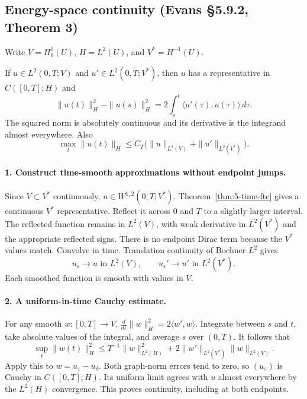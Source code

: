 \subsection{Energy-space continuity (Evans \S5.9.2, Theorem 3)}
Write $V=H^1_0(U)$, $H=L^2(U)$, and $V^*=H^{-1}(U)$.
\begin{theorem}\label{thm:5-energy-time}
If $u\in L^2(0,T;V)$ and $u'\in L^2(0,T;V^*)$, then
$u$ has a representative in $C([0,T];H)$ and
\[
 \|u(t)\|_H^2-\|u(s)\|_H^2
 =2\int_s^t\langle u'(\tau),u(\tau)\rangle\,d\tau.
\]
The squared norm is absolutely continuous and its derivative is the
integrand almost everywhere. Also
\[
 \max_t\|u(t)\|_H
 \leq C_T\bigl(\|u\|_{L^2(V)}+\|u'\|_{L^2(V^*)}\bigr).
\]
\end{theorem}
\begin{expandedproof}
\paragraph{1. Construct time-smooth approximations without endpoint jumps.}
Since $V\subset V^*$ continuously, $u\in W^{1,2}(0,T;V^*)$.
Theorem~\ref{thm:5-time-ftc} gives a continuous $V^*$ representative.
Reflect it across $0$ and $T$ to a slightly larger interval.
The reflected function remains in $L^2(V)$, with weak derivative
in $L^2(V^*)$ and the appropriate reflected signs.
There is no endpoint Dirac term because the $V^*$ values match.
Convolve in time. Translation continuity of Bochner $L^2$ gives
\[
 u_\varepsilon\to u\text{ in }L^2(V),\qquad
 u_\varepsilon'\to u'\text{ in }L^2(V^*).
\]
Each smoothed function is smooth with values in $V$.

\paragraph{2. A uniform-in-time Cauchy estimate.}
For any smooth $w:[0,T]\to V$,
$\frac{d}{dt}\|w\|_H^2=2\langle w',w\rangle$.
Integrate between $s$ and $t$, take absolute values of the integral,
and average $s$ over $(0,T)$. It follows that
\[
 \sup_t\|w(t)\|_H^2
 \leq T^{-1}\|w\|_{L^2(H)}^2
       +2\|w'\|_{L^2(V^*)}\|w\|_{L^2(V)}.
\]
Apply this to $w=u_\varepsilon-u_\delta$. Both graph-norm errors tend
to zero, so $(u_\varepsilon)$ is Cauchy in $C([0,T];H)$.
Its uniform limit agrees with $u$ almost everywhere by the $L^2(H)$
convergence. This proves continuity, including at both endpoints.


\end{expandedproof}
